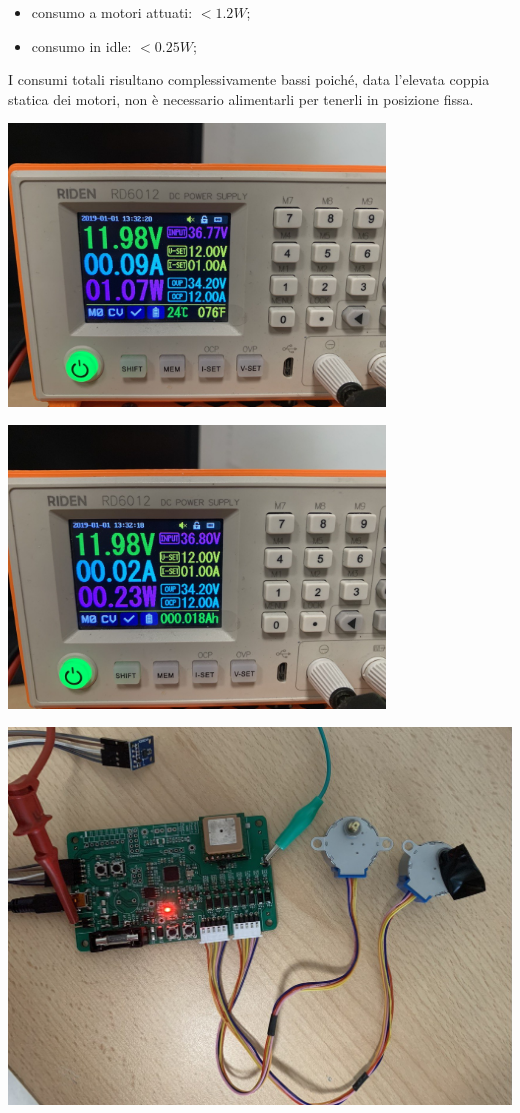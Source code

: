 \begin{itemize}
    \item consumo a motori attuati: $<1.2 W$;
    \item consumo in idle: $<0.25 W$;
\end{itemize}
I consumi totali risultano complessivamente bassi poiché, data l'elevata coppia statica dei motori, non è necessario alimentarli per tenerli in posizione fissa.

\begin{center}
    \includegraphics[width=10cm]{figures/image3.png}
    \captionsetup{type=figure}
\end{center}

\begin{center}
    \includegraphics[width=10cm]{figures/image1.png}
    \captionsetup{type=figure}
\end{center}

\begin{center}
    \includegraphics[width=15cm]{figures/image101.png}
    \captionsetup{type=figure}
\end{center}
